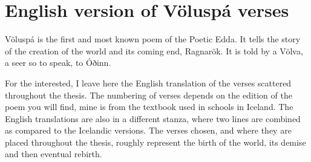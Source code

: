 \chapter{English version of Völuspá verses}

Völuspá is the first and most known poem of the Poetic Edda.
It tells the story of the creation of the world and its coming end, Ragnarök.
It is told by a Völva, a seer so to speak, to Óðinn.

For the interested, I leave here the English translation of the verses scattered throughout the thesis.
The numbering of verses depends on the edition of the poem you will find, mine is from the textbook used in schools in Iceland.
The English translations are also in a different stanza, where two lines are combined as compared to the Icelandic versions.
The verses chosen, and where they are placed throughout the thesis, roughly represent the birth of the world, its demise and then eventual rebirth.

